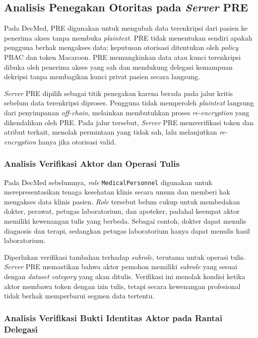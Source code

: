 \subsection{Analisis Penegakan Otoritas pada \textit{Server} PRE}
\label{subsec:analisis-penegakan-otoritas-pre}

Pada DecMed, PRE digunakan untuk mengubah data terenkripsi dari pasien ke penerima akses tanpa membuka \textit{plaintext}. PRE tidak menentukan sendiri apakah pengguna berhak mengakses data; keputusan otorisasi ditentukan oleh \textit{policy} PBAC dan token Macaroon. PRE memungkinkan data atau kunci terenkripsi dibuka oleh penerima akses yang sah dan mendukung delegasi kemampuan dekripsi tanpa membagikan kunci privat pasien secara langsung.

\textit{Server} PRE dipilih sebagai titik penegakan karena berada pada jalur kritis sebelum data terenkripsi diproses. Pengguna tidak memperoleh \textit{plaintext} langsung dari penyimpanan \textit{off-chain}, melainkan membutuhkan proses \textit{re-encryption} yang dikendalikan oleh PRE. Pada jalur tersebut, \textit{Server} PRE memverifikasi token dan atribut terkait, menolak permintaan yang tidak sah, lalu melanjutkan \textit{re-encryption} hanya jika otorisasi valid.

\subsubsection{Analisis Verifikasi Aktor dan Operasi Tulis}
\label{subsec:analisis-verifikasi-aktor-operasi-tulis}

Pada DecMed sebelumnya, \textit{role} \texttt{MedicalPersonnel} digunakan untuk merepresentasikan tenaga kesehatan klinis secara umum dan memberi hak mengakses data klinis pasien. \textit{Role} tersebut belum cukup untuk membedakan dokter, perawat, petugas laboratorium, dan apoteker, padahal keempat aktor memiliki kewenangan tulis yang berbeda. Sebagai contoh, dokter dapat menulis diagnosis dan terapi, sedangkan petugas laboratorium hanya dapat menulis hasil laboratorium.

Diperlukan verifikasi tambahan terhadap \textit{subrole}, terutama untuk operasi tulis. \textit{Server} PRE memastikan bahwa aktor pemohon memiliki \textit{subrole} yang sesuai dengan \textit{dataset category} yang akan ditulis. Verifikasi ini menolak kondisi ketika aktor membawa token dengan izin tulis, tetapi secara kewenangan profesional tidak berhak memperbarui segmen data tertentu.

\subsubsection{Analisis Verifikasi Bukti Identitas Aktor pada Rantai Delegasi}
\label{subsec:analisis-verifikasi-bukti-identitas-aktor-aktif}

